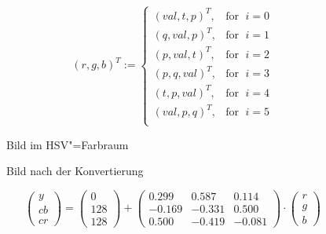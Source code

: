 \documentclass[a4paper,12pt,abstracton,titlepage]{scrartcl}
\begin{document}


\[
  (r,g,b)^T := \left\{\begin{array}{lr}
        (val,t,p)^T, & \text{for }\; i = 0\\
        (q,val,p)^T, & \text{for }\; i = 1\\
        (p,val,t)^T, & \text{for }\; i = 2\\
        (p,q,val)^T, & \text{for }\; i = 3\\
        (t,p,val)^T, & \text{for }\; i = 4\\
        (val,p,q)^T, & \text{for }\; i = 5\\
        \end{array}\right.
  \]
  

\begin{figure}[htbp]
\begin{minipage}[t]{0.48\textwidth}
  \begin{center}
    \caption{Bild im HSV"=Farbraum}
    \label{hsvVorher}
  \end{center}
\end{minipage}
\begin{minipage}[t]{0.52\textwidth}
  \begin{center}
    \caption{Bild nach der Konvertierung}
    \label{hsv2rgb}
  \end{center}
\end{minipage}
\end{figure}


\[
    \left(\begin{array}{c} y \\ cb \\ cr \end{array}\right) =
    \left(\begin{array}{c} 0 \\ 128 \\ 128 \end{array}\right)
    +
    \begin{pmatrix} 0.299 & 0.587 & 0.114 \\ -0.169 & -0.331 & 0.500 \\ 0.500 & -0.419 & -0.081
    \end{pmatrix} \cdot \left(\begin{array}{c} r \\ g \\ b \end{array}\right)
\]
\end{document}

